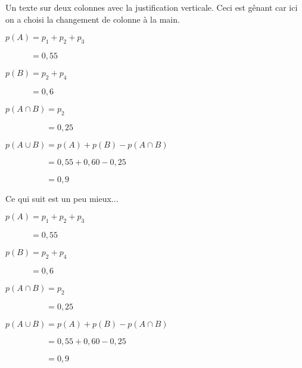 \documentclass[10pt,a4paper]{article}
\begin{document}
Un texte sur deux colonnes avec la justification verticale.
Ceci est gênant car ici on a choisi la changement de colonne à la main.

\begin{multicols}{2}
	$p(A) = p_{1} + p_{2} + p_{3}$

	$\phantom{p(A)} = 0,55$


	$p(B) = p_{2} + p_{4}$

	$\phantom{p(B)} = 0,6$


	\columnbreak

	$p(A \cap B) = p_{2}$

	$\phantom{p(A \cap B)} = 0,25$


	$p(A \cup B) = p(A) + p(B) - p(A \cap B)$

	$\phantom{p(A \cup B)} = 0,55 + 0,60 - 0,25$

	$\phantom{p(A \cup B)} = 0,9$
\end{multicols}


Ce qui suit est un peu mieux...

\raggedcolumns
\begin{multicols}{2}
	$p(A) = p_{1} + p_{2} + p_{3}$

	$\phantom{p(A)} = 0,55$


	$p(B) = p_{2} + p_{4}$

	$\phantom{p(B)} = 0,6$


	\columnbreak

	$p(A \cap B) = p_{2}$

	$\phantom{p(A \cap B)} = 0,25$


	$p(A \cup B) = p(A) + p(B) - p(A \cap B)$

	$\phantom{p(A \cup B)} = 0,55 + 0,60 - 0,25$

	$\phantom{p(A \cup B)} = 0,9$
\end{multicols}
\end{document}
